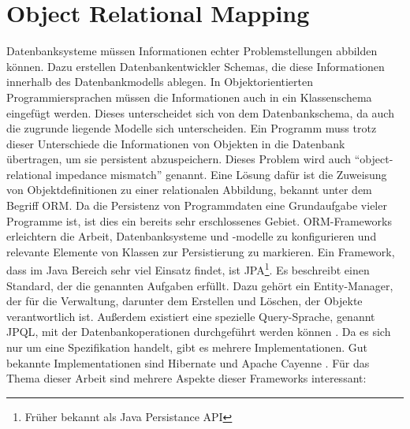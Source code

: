 




\section{Object Relational Mapping}

Datenbanksysteme müssen Informationen echter Problemstellungen abbilden können. Dazu erstellen Datenbankentwickler Schemas, die diese Informationen innerhalb des Datenbankmodells ablegen. In Objektorientierten Programmiersprachen müssen die Informationen auch in ein Klassenschema eingefügt werden. Dieses unterscheidet sich von dem Datenbankschema, da auch die zugrunde liegende Modelle sich unterscheiden. Ein Programm muss trotz dieser Unterschiede die Informationen von Objekten in die Datenbank übertragen, um sie persistent abzuspeichern. Dieses Problem wird auch ``object-relational impedance mismatch'' genannt.\cite{Davoudian.2018}
Eine Lösung dafür ist die Zuweisung von Objektdefinitionen zu einer relationalen Abbildung, bekannt unter dem Begriff \ac{ORM}.
Da die Persistenz von Programmdaten eine Grundaufgabe vieler Programme ist, ist dies ein bereits sehr erschlossenes Gebiet. \ac{ORM}-Frameworks erleichtern die Arbeit, Datenbanksysteme und -modelle zu konfigurieren und relevante Elemente von Klassen zur Persistierung zu markieren.
Ein Framework, dass im Java Bereich sehr viel Einsatz findet, ist \ac{JPA}\footnote{Früher bekannt als Java Persistance API}. Es beschreibt einen Standard, der die genannten Aufgaben erfüllt. Dazu gehört ein Entity-Manager, der für die Verwaltung, darunter dem Erstellen und Löschen, der Objekte verantwortlich ist. Außerdem existiert eine spezielle Query-Sprache, genannt \ac{JPQL}, mit der Datenbankoperationen durchgeführt werden können \cite{jpa.14.07.2021}. Da es sich nur um eine Spezifikation handelt, gibt es mehrere Implementationen. Gut bekannte Implementationen sind Hibernate \cite{hibernate.13.07.2021} und Apache Cayenne \cite{cayenne.19.03.2021}.
Für das Thema dieser Arbeit sind mehrere Aspekte dieser Frameworks interessant:
